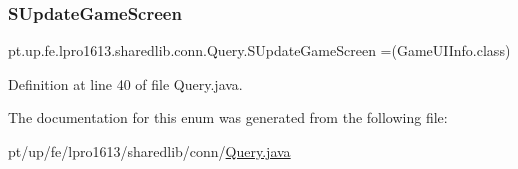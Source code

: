 \subsubsection{\texorpdfstring{S\+Update\+Game\+Screen}{SUpdateGameScreen}}
{\footnotesize\ttfamily pt.\+up.\+fe.\+lpro1613.\+sharedlib.\+conn.\+Query.\+S\+Update\+Game\+Screen =(Game\+U\+I\+Info.\+class)}



Definition at line 40 of file Query.\+java.



The documentation for this enum was generated from the following file\+:\begin{DoxyCompactItemize}
\item 
pt/up/fe/lpro1613/sharedlib/conn/\hyperlink{_query_8java}{Query.\+java}\end{DoxyCompactItemize}
